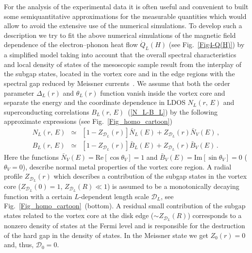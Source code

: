 \documentclass[prx,twocolumn,aps,superscriptaddress,showpacs,amsmath,amssymb,footnoteinbib]{revtex4-1}
\begin{document}
For the analysis of the experimental data it is often useful and
convenient to built some semiquantitative approximations for the
measurable quantities which would allow to avoid the extensive use
of the numerical simulations. To develop such a description  we
try to fit the above numerical simulations of the magnetic field
dependence of the electron--phonon heat flow $\dot{Q}_L(H)$ (see
Fig.~\ref{Fig4-Q(H)}) by a simplified model taking into account
that the overall spectral characteristics and local density of
states of the mesoscopic sample result from the interplay of the
subgap states, located in the vortex core and in the edge regions
with the spectral gap reduced by Meissner currents~\cite{Samokhvalov-PRB19-DOS}. We assume that both the order
parameter $\Delta_L(r)$ and $\theta_L(r)$ function vanish inside
the vortex core and
separate the energy and the coordinate dependence
in LDOS $N_L(r,\, E)$ and superconducting correlations
$B_L(r,\, E)$~(\ref{N_L-B_L}) by the following approximate expressions (see Fig.~\ref{Fig_homo_cartoon})
%
\begin{eqnarray}
    N_L(r,\, E) &\simeq& \left[ 1 - Z_{\mathcal{D}_L}(r) \right] \bar{N}_L(E)
        + Z_{\mathcal{D}_L}(r) \bar{N}_V(E)\,, \label{N_L-appr} \\
    B_L(r,\,E) &\simeq&  \left[ 1 - Z_{\mathcal{D}_L}(r) \right] \bar{B}_L(E)
        + Z_{\mathcal{D}_L}(r) \bar{B}_V(E)\,.  \label{B_L-appr}
\end{eqnarray}
%
Here the functions $\bar{N}_V(E) = \mathrm{Re}[\cos\theta_V] = 1$
and $\bar{B}_V(E)= \mathrm{Im}[\sin\theta_V] = 0$ ($\theta_V =
0$), describe normal metal properties of the vortex core region.
A radial profile $Z_{\mathcal{D}_L}(r)$ which describes a
contribution of the subgap states in the vortex core
($Z_{\mathcal{D}_L}(0) = 1$, $Z_{\mathcal{D}_L}(R) \ll 1$)
is assumed to be a monotonically decaying function
with a certain $L$-dependent length scale $\mathcal{D}_L$, see Fig.~\ref{Fig_homo_cartoon}~(bottom).
A residual small contribution of the subgap states related to the vortex core
at the disk edge ($\sim Z_{\mathcal{D}_L}(R)$) corresponds to a
nonzero density of states at the Fermi level and is responsible
for the destruction of the hard gap in the density of states. In
the Meissner state we get $Z_0(r) = 0$ and, thus, $\mathcal{D}_0 = 0$.
\end{document}

